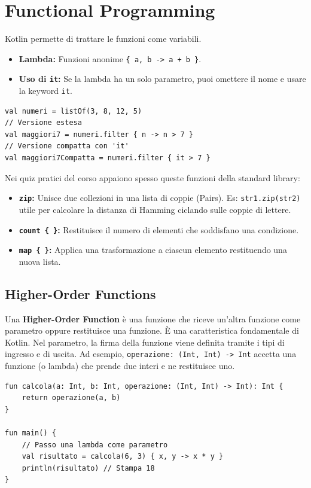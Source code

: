 \section{Functional Programming}
Kotlin permette di trattare le funzioni come variabili.
\begin{itemize}
    \item \textbf{Lambda:} Funzioni anonime \texttt{\{ a, b -> a + b \}}.
    \item \textbf{Uso di \texttt{it}:} Se la lambda ha un solo parametro, puoi omettere il nome e usare la keyword \texttt{it}.
\end{itemize}

\begin{lstlisting}[caption={Esempio di Lambda e Filter}]
val numeri = listOf(3, 8, 12, 5)
// Versione estesa
val maggiori7 = numeri.filter { n -> n > 7 }
// Versione compatta con 'it'
val maggiori7Compatta = numeri.filter { it > 7 }
\end{lstlisting}

\begin{tcolorbox}[colback=green!5!white,colframe=green!50!black,title=Funzioni sulle Collezioni (Viste nei Quiz)]
    Nei quiz pratici del corso appaiono spesso queste funzioni della standard library:
    \begin{itemize}
        \item \textbf{\texttt{zip}:} Unisce due collezioni in una lista di coppie (Pairs). Es: \texttt{str1.zip(str2)} utile per calcolare la distanza di Hamming ciclando sulle coppie di lettere.
        \item \textbf{\texttt{count \{ \}}:} Restituisce il numero di elementi che soddisfano una condizione.
        \item \textbf{\texttt{map \{ \}}:} Applica una trasformazione a ciascun elemento restituendo una nuova lista.
    \end{itemize}
\end{tcolorbox}

\subsection{Higher-Order Functions}
Una \textbf{Higher-Order Function} è una funzione che riceve un'altra funzione come parametro oppure restituisce una funzione. È una caratteristica fondamentale di Kotlin.
Nel parametro, la firma della funzione viene definita tramite i tipi di ingresso e di uscita. Ad esempio, \texttt{operazione: (Int, Int) -> Int} accetta una funzione (o lambda) che prende due interi e ne restituisce uno.

\begin{lstlisting}[caption={Esempio Quiz: Calcolatrice}]
fun calcola(a: Int, b: Int, operazione: (Int, Int) -> Int): Int {
    return operazione(a, b)
}

fun main() {
    // Passo una lambda come parametro
    val risultato = calcola(6, 3) { x, y -> x * y }
    println(risultato) // Stampa 18
}
\end{lstlisting}